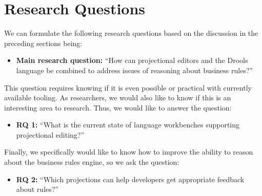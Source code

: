 \section{Research Questions}
\label{section:Research_Questions}

We can formulate the following research questions based on the discussion in the preceding sections being:

\begin{itemize}
    \setlength\itemsep{0em}
    \item \textbf{Main research question:} ``How can projectional editors and the Drools language be combined to address issues of reasoning about business rules?''
\end{itemize}

This question requires knowing if it is even possible or practical with currently available tooling. 
As researchers, we would also like to know if this is an interesting area to research. 
Thus, we would like to answer the question:
\begin{itemize}
    \setlength\itemsep{0em}
    \item \textbf{RQ 1:} ``What is the current state of language workbenches supporting projectional editing?''
\end{itemize}

Finally, we specifically would like to know how to improve the ability to reason about the business rules engine, so we ask the question:
\begin{itemize}
    \setlength\itemsep{0em}
    \item \textbf{RQ 2:} ``Which projections can help developers get appropriate feedback about rules?''
\end{itemize}
